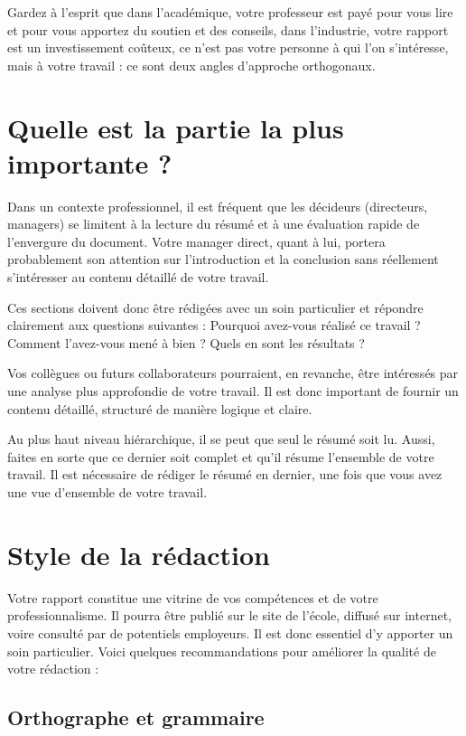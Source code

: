 Gardez à l'esprit que dans l'académique, votre professeur est payé pour vous lire et pour vous apportez du soutien et des conseils, dans l'industrie, votre rapport est un investissement coûteux, ce n'est pas votre personne à qui l'on s'intéresse, mais à votre travail : ce sont deux angles d'approche orthogonaux.

\section{Quelle est la partie la plus importante ?}

Dans un contexte professionnel, il est fréquent que les décideurs (directeurs, managers) se limitent à la lecture du résumé et à une évaluation rapide de l'envergure du document. Votre manager direct, quant à lui, portera probablement son attention sur l'introduction et la conclusion sans réellement s'intéresser au contenu détaillé de votre travail.

Ces sections doivent donc être rédigées avec un soin particulier et répondre clairement aux questions suivantes : Pourquoi avez-vous réalisé ce travail ? Comment l'avez-vous mené à bien ? Quels en sont les résultats ?

Vos collègues ou futurs collaborateurs pourraient, en revanche, être intéressés par une analyse plus approfondie de votre travail. Il est donc important de fournir un contenu détaillé, structuré de manière logique et claire.

Au plus haut niveau hiérarchique, il se peut que seul le résumé soit lu. Aussi, faites en sorte que ce dernier soit complet et qu'il résume l'ensemble de votre travail. Il est nécessaire de rédiger le résumé en dernier, une fois que vous avez une vue d'ensemble de votre travail.

\section{Style de la rédaction}

Votre rapport constitue une vitrine de vos compétences et de votre professionnalisme. Il pourra être publié sur le site de l'école, diffusé sur internet, voire consulté par de potentiels employeurs. Il est donc essentiel d'y apporter un soin particulier. Voici quelques recommandations pour améliorer la qualité de votre rédaction :

\subsection{Orthographe et grammaire}

